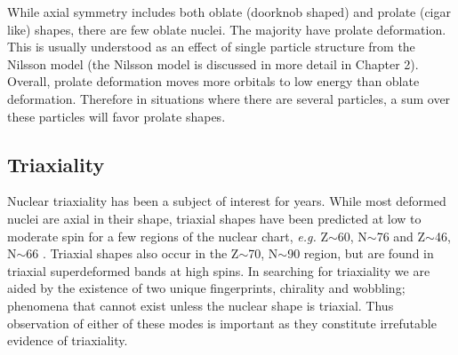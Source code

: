 While axial symmetry includes both oblate (doorknob shaped) and prolate (cigar like) shapes, there are few oblate nuclei. The majority have prolate deformation. This is usually understood as an effect of single particle structure from the Nilsson model (the Nilsson model is discussed in more detail in Chapter 2). Overall, prolate deformation moves more orbitals to low energy than oblate deformation. Therefore in situations where there are several particles, a sum over these particles will favor prolate shapes.

\subsection{Triaxiality}
\label{ssec:intro-rot-triax}
Nuclear triaxiality has been a subject of interest for years. While most deformed nuclei are axial in their shape, triaxial shapes have been predicted at low to moderate spin for a few regions of the nuclear chart, \emph{e.g.} Z$\sim{}$60, N$\sim{}$76 and Z$\sim{}$46, N$\sim{}$66 \cite{groundStateTriax}. Triaxial shapes also occur in the Z$\sim{}$70, N$\sim{}$90 region, but are found in triaxial superdeformed bands at high spins. In searching for triaxiality we are aided by the existence of two unique fingerprints, chirality and wobbling; phenomena that cannot exist unless the nuclear shape is triaxial. Thus observation of either of these modes is important as they constitute irrefutable evidence of triaxiality.



